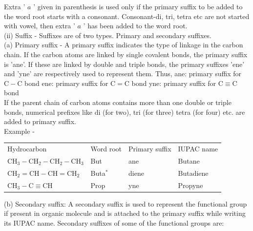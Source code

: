 \documentclass[10pt]{article}
\begin{document}
Extra ' $a$ ' given in parenthesis is used only if the primary suffix to be added to the word root starts with a consonant. Consonant-di, tri, tetra etc are not started with vowel, then extra ' $a$ ' has been added to the word root.\\
(ii) Suffix - Suffixes are of two types. Primary and secondary suffixes.\\
(a) Primary suffix - A primary suffix indicates the type of linkage in the carbon chain. If the carbon atoms are linked by single covalent bonds, the primary suffix is 'ane'. If these are linked by double and triple bonds, the primary suffixes 'ene' and 'yne' are respectively used to represent them. Thus, ane: primary suffix for $\mathrm{C}-\mathrm{C}$ bond ene: primary suffix for $\mathrm{C}=\mathrm{C}$ bond yne: primary suffix for $\mathrm{C} \equiv \mathrm{C}$ bond\\
If the parent chain of carbon atoms contains more than one double or triple bonds, numerical prefixes like di (for two), tri (for three) tetra (for four) etc. are added to primary suffix.\\
Example -

\begin{center}
\begin{tabular}{llll}
Hydrocarbon & Word root & Primary suffix & IUPAC name \\
$\mathrm{CH}_{3}-\mathrm{CH}_{2}-\mathrm{CH}_{2}-\mathrm{CH}_{3}$ & But & ane & Butane \\
$\mathrm{CH}_{2}=\mathrm{CH}-\mathrm{CH}=\mathrm{CH}_{2}$ & Buta$^{*}$ & diene & Butadiene \\
$\mathrm{CH}_{3}-\mathrm{C} \equiv \mathrm{CH}$ & Prop & yne & Propyne \\
\end{tabular}
\end{center}

(b) Secondary suffix: A secondary suffix is used to represent the functional group if present in organic molecule and is attached to the primary suffix while writing its IUPAC name. Secondary suffixes of some of the functional groups are:
\end{document}
